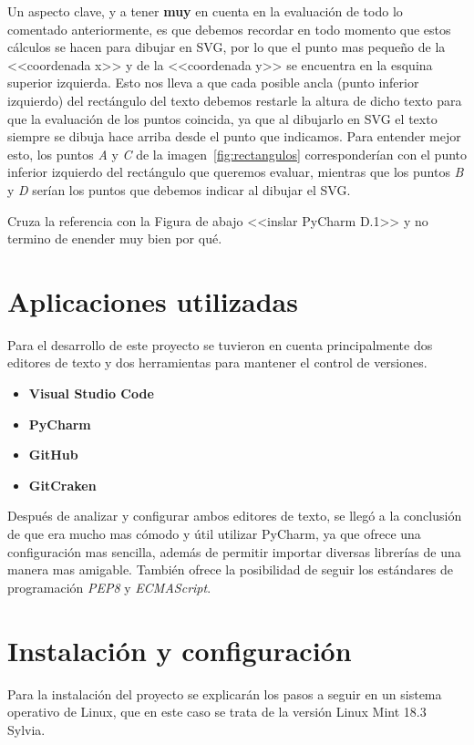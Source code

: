 Un aspecto clave, y a tener \textbf{muy} en cuenta en la evaluación de todo lo comentado anteriormente, es que debemos recordar en todo momento que estos cálculos se hacen para dibujar en SVG, por lo que el punto mas pequeño de la <<coordenada x>> y de la <<coordenada y>> se encuentra en la esquina superior izquierda. Esto nos lleva a que cada posible ancla (punto inferior izquierdo) del rectángulo del texto debemos restarle la altura de dicho texto para que la evaluación de los puntos coincida, ya que al dibujarlo en SVG el texto siempre se dibuja hace arriba desde el punto que indicamos. Para entender mejor esto, los puntos \textit{A} y \textit{C} de la imagen~\ref{fig:rectangulos} corresponderían con el punto inferior izquierdo del rectángulo que queremos evaluar, mientras que los puntos \textit{B} y \textit{D} serían los puntos que debemos indicar al dibujar el SVG.

Cruza la referencia con la Figura de abajo <<inslar PyCharm D.1>> y no termino de enender muy bien por qué.


\section{Aplicaciones utilizadas}
Para el desarrollo de este proyecto se tuvieron en cuenta principalmente dos editores de texto y dos herramientas para mantener el control de versiones.

\begin{itemize}
	\item \textbf{Visual Studio Code} 
	\item \textbf{PyCharm}
	\item \textbf{GitHub}
	\item \textbf{GitCraken}
\end{itemize}
Después de analizar y configurar ambos editores de texto, se llegó a la conclusión de que era mucho mas cómodo y útil utilizar PyCharm, ya que ofrece una configuración mas sencilla, además de permitir importar diversas librerías de una manera mas amigable. También ofrece la posibilidad de seguir los estándares de programación \textit{PEP8} y \textit{ECMAScript}.

\section{Instalación y configuración}
Para la instalación del proyecto se explicarán los pasos a seguir en un sistema operativo de Linux, que en este caso se trata de la versión Linux Mint 18.3 Sylvia.

